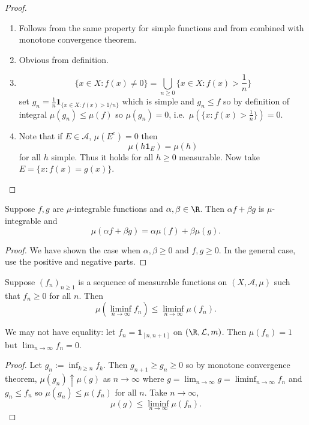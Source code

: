 \documentclass[a4paper]{article}
\begin{document}
\begin{proof}\leavevmode
  \begin{enumerate}
  \item Follows from the same property for simple functions and from  combined with monotone convergence theorem.
  \item Obvious from definition.
  \item
    \[
      \{x \in X: f(x) \neq 0\} = \bigcup_{n \geq 0} \{x \in X: f(x) > \frac{1}{n}\}
    \]
    set \(g_n = \frac{1}{n} \mathbf 1_{\{x \in X: f(x) > 1/n\}}\) which is simple and \(g_n \leq f\) so by definition of integral \(\mu(g_n) \leq \mu(f)\) so \(\mu(g_n) = 0\), i.e.\ \(\mu(\{x: f(x) > \frac{1}{n}\}) = 0\).
  \item Note that if \(E \in \mathcal A\), \(\mu(E^c) = 0\) then
    \[
      \mu(h \mathbf 1_E) = \mu(h)
    \]
    for all \(h\) simple. Thus it holds for all \(h \geq 0\) measurable. Now take \(E = \{x: f(x) = g(x)\}\).
  \end{enumerate}
\end{proof}

\begin{proposition}
  Suppose \(f, g\) are \(\mu\)-integrable functions and \(\alpha, \beta \in \R\). Then \(\alpha f + \beta g\) is \(\mu\)-integrable and
  \[
    \mu(\alpha f + \beta g) = \alpha \mu(f) + \beta \mu(g).
  \]
\end{proposition}

\begin{proof}
  We have shown the case when \(\alpha, \beta \geq 0\) and \(f, g \geq 0\). In the general case, use the positive and negative parts.
\end{proof}

\begin{lemma}
  Suppose \((f_n)_{n \geq 1}\) is a sequence of measurable functions on \((X, \mathcal A, \mu)\) such that \(f_n \geq 0\) for all \(n\). Then
  \[
    \mu(\liminf_{n \to \infty} f_n) \leq \liminf_{n \to \infty} \mu(f_n).
  \]
\end{lemma}

\begin{remark}
  We may not have equality: let \(f_n = \mathbf 1_{[n, n + 1]}\) on \((\R, \mathcal L, m)\). Then \(\mu(f_n) = 1\) but \(\lim_{n \to \infty} f_n = 0\).
\end{remark}

\begin{proof}
  Let \(g_n := \inf_{k \geq n} f_k\). Then \(g_{n + 1} \geq g_n \geq 0\) so by monotone convergence theorem, \(\mu(g_n) \uparrow \mu(g)\) as \(n \to \infty\) where \(g = \lim_{n \to \infty} g = \liminf_{n \to \infty} f_n\) and \(g_n \leq f_n\) so \(\mu(g_n) \leq \mu(f_n)\) for all \(n\). Take \(n \to \infty\),
  \[
    \mu(g) \leq \liminf_{n \to \infty} \mu(f_n).
  \]
\end{proof}
\end{document}
